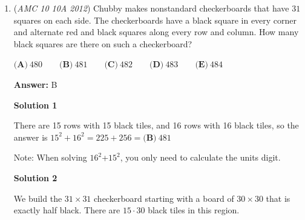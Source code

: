 \begin{enumerate}
 $a=1,b=2,c=3,d=4,e=5$,

 and in order to minimize the fraction,

 $a=5,b=4,c=3,d=2,e=1$.

 After plugging in these values and finding the positive difference of the two fractions, we arrive with $\frac{34}{16} \Rightarrow \frac{17}{8}$, which is our answer of $\boxed{\textbf{(C)}}$




\textbf{Solution 2}

The minimum and maximum can be achieved with the orders $5, 4, 3, 2, 1$ and $1, 2, 3, 4, 5$ respectively. We can see this because the iterative average is like a weighted average that gives more weight to later numbers. 

 $5,4,3,2,1 \Rightarrow \frac92,3,2,1 \Rightarrow \frac{15}{4},2,1 \Rightarrow \frac{23}{8},1 \Rightarrow \frac{31}{16}$
$1,2,3,4,5 \Rightarrow \frac32,3,4,5 \Rightarrow \frac94,4,5 \Rightarrow \frac{25}{8},5 \Rightarrow \frac{65}{16}$

 The difference between the two is $\frac{65}{16}-\frac{31}{16}=\frac{34}{16}=\boxed{\textbf{(C)}\ \frac{17}{8}}$.

 


	\item (\textit{AMC 10 10A 2012}) Chubby makes nonstandard checkerboards that have $31$ squares on each side.  The checkerboards have a black square in every corner and alternate red and black squares along every row and column.  How many black squares are there on such a checkerboard?


 $\textbf{(A)}\ 480 \qquad\textbf{(B)}\ 481 \qquad\textbf{(C)}\ 482 \qquad\textbf{(D)}\ 483 \qquad\textbf{(E)}\ 484$

 \textbf{Answer: }B



\textbf{Solution 1}

There are 15 rows with 15 black tiles, and 16 rows with 16 black tiles, so the answer is $15^2+16^2 =225+256= \boxed{\textbf{(B)}\ 481}$

 Note: When solving $16^2$+$15^2$, you only need to calculate the units digit.

 



\textbf{Solution 2}

We build the $31 \times 31$ checkerboard starting with a board of $30 \times 30$ that is exactly half black.  There are $15 \cdot 30$ black tiles in this region.


\end{enumerate}
